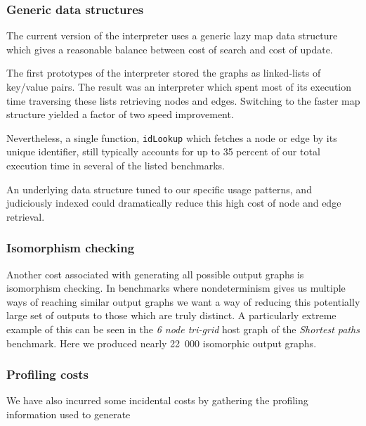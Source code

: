\subsubsection*{Generic data structures}

The current version of the interpreter uses a generic lazy map data structure which gives a reasonable balance between cost of search and cost of update. 



The first prototypes of the interpreter stored the graphs as linked-lists of key/value pairs. The result was an interpreter which spent most of its execution time traversing these lists retrieving nodes and edges. Switching to the faster map structure yielded a factor of two speed improvement.

Nevertheless, a single function, \texttt{idLookup} which fetches a node or edge by its unique identifier, still typically accounts for up to 35 percent of our total execution time in several of the listed benchmarks.

An underlying data structure tuned to our specific usage patterns, and judiciously indexed could dramatically reduce this high cost of node and edge retrieval.


\subsubsection*{Isomorphism checking}

Another cost associated with generating all possible output graphs is isomorphism checking. In benchmarks where nondeterminism gives us multiple ways of reaching similar output graphs we want a way of reducing this potentially large set of outputs to those which are truly distinct. A particularly extreme example of this can be seen in the \textit{6 node tri-grid} host graph of the \textit{Shortest paths} benchmark. Here we produced nearly 22~000 isomorphic output graphs.


\subsubsection*{Profiling costs}

We have also incurred some incidental costs by gathering the profiling information used to generate 



